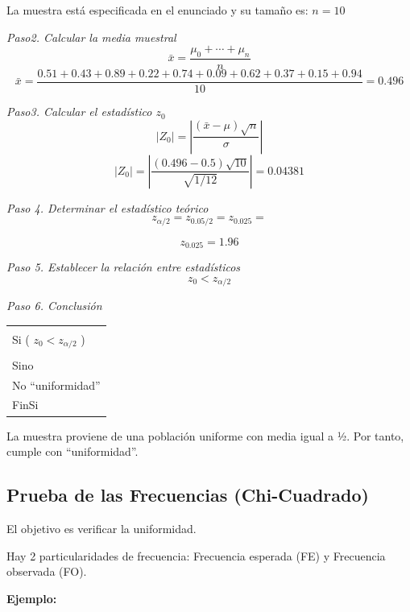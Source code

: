 \documentclass[11pt,letterpaper]{report}
\newenvironment{algoritmo}
  {\begin{center}\begin{tabular}{|p{0.85\textwidth}|}\hline\vspace{-0.2cm}\begin{tabbing}\hspace{0.6cm}\=\hspace{0.6cm}\=\hspace{0.6cm}\=\hspace{0.6cm}\=\hspace{0.6cm}\=\kill}
  {\end{tabbing}\vspace{-0.4cm}\\\hline\end{tabular}\end{center}}
\begin{document}
La muestra está especificada en el enunciado y su tamaño es: $n = 10$

\textit{Paso2. Calcular la media muestral}
\[
\bar{x} = \frac{\mu_0 + \cdots + \mu_n}{n}
\]
\[
\bar{x} = \frac{0.51 + 0.43 + 0.89 + 0.22 + 0.74 + 0.09 + 0.62 + 0.37 + 0.15 + 0.94}{10} = 0.496
\]

\textit{Paso3. Calcular el estadístico $z_0$}
\[
|Z_0| = \left|\frac{(\bar{x} - \mu)\sqrt{n}}{\sigma}\right|
\]
\[
|Z_0| = \left|\frac{(0.496 - 0.5)\sqrt{10}}{\sqrt{1/12}}\right| = 0.04381
\]

\textit{Paso 4. Determinar el estadístico teórico}
\[
z_{\alpha/2} = z_{0.05/2} = z_{0.025} =
\]

\begin{center}
\end{center}
\[
z_{0.025} = 1.96
\]

\textit{Paso 5. Establecer la relación entre estadísticos}
\[
z_0 < z_{\alpha/2}
\]

\textit{Paso 6. Conclusión}

\begin{algoritmo}
\>$0.04381 < 1.96 \rightarrow$ verdad\\
\>Si ( $z_0 < z_{\alpha/2}$ )\\
\>\>\fbox{Uniformidad}\\
\>Sino\\
\>\>No ``uniformidad''\\
\>FinSi
\end{algoritmo}

La muestra proviene de una población uniforme con media igual a ½. Por tanto, cumple con ``uniformidad''.

\subsection*{Prueba de las Frecuencias (Chi-Cuadrado)}

El objetivo es verificar la uniformidad.

Hay 2 particularidades de frecuencia: Frecuencia esperada (FE) y Frecuencia observada (FO).

\textbf{Ejemplo:}
\end{document}
